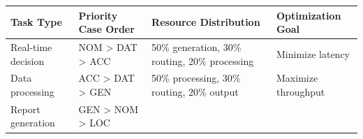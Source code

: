 \documentclass[
  11pt,
  letterpaper,
]{article}
\begin{document}
\begin{longtable}[]{@{}llll@{}}
\toprule
\begin{minipage}[b]{0.14\columnwidth}\raggedright
Task Type\strut
\end{minipage} & \begin{minipage}[b]{0.26\columnwidth}\raggedright
Priority Case Order\strut
\end{minipage} & \begin{minipage}[b]{0.27\columnwidth}\raggedright
Resource Distribution\strut
\end{minipage} & \begin{minipage}[b]{0.22\columnwidth}\raggedright
Optimization Goal\strut
\end{minipage}\tabularnewline
\midrule
\endhead
\begin{minipage}[t]{0.14\columnwidth}\raggedright
Real-time decision\strut
\end{minipage} & \begin{minipage}[t]{0.26\columnwidth}\raggedright
NOM \textgreater{} DAT \textgreater{} ACC\strut
\end{minipage} & \begin{minipage}[t]{0.27\columnwidth}\raggedright
50\% generation, 30\% routing, 20\% processing\strut
\end{minipage} & \begin{minipage}[t]{0.22\columnwidth}\raggedright
Minimize latency\strut
\end{minipage}\tabularnewline
\begin{minipage}[t]{0.14\columnwidth}\raggedright
Data processing\strut
\end{minipage} & \begin{minipage}[t]{0.26\columnwidth}\raggedright
ACC \textgreater{} DAT \textgreater{} GEN\strut
\end{minipage} & \begin{minipage}[t]{0.27\columnwidth}\raggedright
50\% processing, 30\% routing, 20\% output\strut
\end{minipage} & \begin{minipage}[t]{0.22\columnwidth}\raggedright
Maximize throughput\strut
\end{minipage}\tabularnewline
\begin{minipage}[t]{0.14\columnwidth}\raggedright
Report generation\strut
\end{minipage} & \begin{minipage}[t]{0.26\columnwidth}\raggedright
GEN \textgreater{} NOM \textgreater{} LOC\strut
\end{minipage} & \begin{minipage}[t]{0.27\columnwidth}\raggedright

\end{minipage}
\end{longtable}
\end{document}
